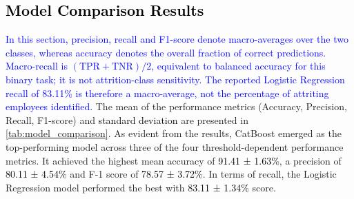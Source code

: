 \documentclass[a4paper,fleqn]{cas-sc}
\begin{document}
\subsection{\textcolor{black}{Model Comparison Results}}
\label{model-comparison}
\textcolor{blue}{In this section, precision, recall and F1-score denote macro-averages over the two classes, whereas accuracy denotes the overall fraction of correct predictions. Macro-recall is $(\mathrm{TPR}+\mathrm{TNR})/2$, equivalent to balanced accuracy for this binary task; it is not attrition-class sensitivity. The reported Logistic Regression recall of 83.11\% is therefore a macro-average, not the percentage of attriting employees identified.} The mean of the performance metrics (Accuracy, Precision, Recall, F1-score) and \textcolor{black}{standard deviation} are presented in \cref{tab:model_comparison}. As evident from the results, CatBoost emerged as the top-performing model across three of the four threshold-dependent performance metrics. It achieved the highest mean accuracy of \textcolor{black}{91.41 ± 1.63\%}, a precision of \textcolor{black}{80.11 ± 4.54\%} and F-1 score of \textcolor{black}{78.57 ± 3.72\%}. In terms of recall, the Logistic Regression model performed the best with \textcolor{black}{83.11 ± 1.34\%} score.
\end{document}
